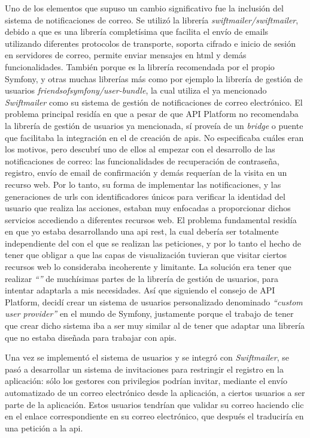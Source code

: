 Uno de los elementos que supuso un cambio significativo fue la inclusión del
sistema de notificaciones de correo. Se utilizó la librería \textit{swiftmailer/swiftmailer},
debido a que es una librería completísima que facilita el envío de emails utilizando
diferentes protocolos de transporte, soporta cifrado e inicio de sesión en
servidores de correo, permite enviar mensajes en \gls{html}\cite{swiftmailer_symfony} y demás
funcionalidades. También porque es la librería recomendada por el propio 
Symfony, y otras muchas librerías más como por ejemplo la librería de gestión de usuarios
\textit{friendsofsymfony/user-bundle}, la cual utiliza el ya mencionado \textit{Swiftmailer} como
su sistema de gestión de notificaciones de correo electrónico. El problema principal residía en que
a pesar de que API Platform no recomendaba la librería de gestión de usuarios ya mencionada, sí
proveía de un \textit{bridge}\cite{apip_fosuser} o puente que facilitaba la integración en el 
de creación de \gls{api}s. No especificaba cuáles eran los motivos, pero descubrí
uno de ellos al empezar con el desarrollo de las notificaciones de correo: las
funcionalidades de recuperación de contraseña, registro, envío de email de confirmación
y demás requerían de la visita en un recurso web. Por lo tanto, su forma de implementar
las notificaciones, y las generaciones de \gls{url}s con identificadores únicos para
verificar la identidad del usuario que realiza las acciones, estaban muy enfocadas a
proporcionar dichos servicios accediendo a diferentes recursos web. El problema
fundamental residía en que yo estaba desarrollando una \gls{api} \gls{rest}, la
cual debería ser totalmente independiente del  con el
que se realizan las peticiones, y por lo tanto el hecho de tener que obligar a que
las capas de visualización tuvieran que visitar ciertos recursos web lo consideraba
incoherente y limitante. La solución era tener que realizar \textit{``''}
de muchísimas partes de la librería de gestión de usuarios, para intentar adaptarla a
mis necesidades. Así que siguiendo el consejo de API Platform, decidí crear un sistema
de usuarios personalizado \textemdash denominado \textit{``custom user provider''} en
el mundo de Symfony\textemdash, justamente porque el trabajo de tener que crear dicho
sistema iba a ser muy similar al de tener que adaptar una librería que no estaba diseñada
para trabajar con \gls{api}s.

Una vez se implementó el sistema de usuarios y se integró con \textit{Swiftmailer},
se pasó a desarrollar un sistema de invitaciones para restringir el registro en la
aplicación: sólo los gestores con privilegios podrían invitar, mediante el envío
automatizado de un correo electrónico desde la aplicación, a ciertos usuarios a ser
parte de la aplicación. Estos usuarios tendrían que validar su correo haciendo clic en
el enlace correspondiente en su correo electrónico, que después el 
traduciría en una petición a la \gls{api}.

